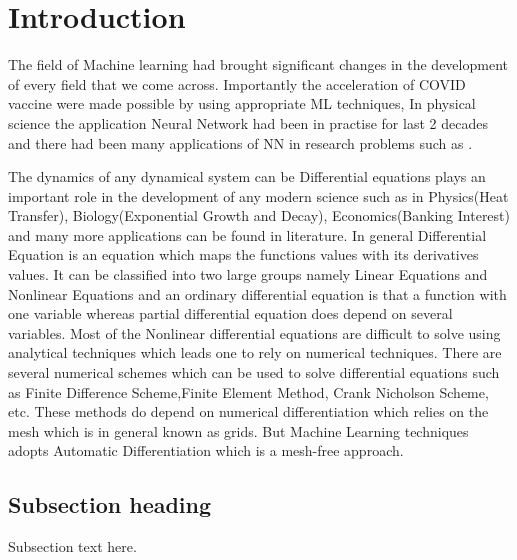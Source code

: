 \documentclass{pramana}
\begin{document}

\artcitid{\#\#\#\#}
\setcounter{page}{23}



\section{Introduction}
The field of Machine learning had brought significant changes in the development of every field that we come across. Importantly the acceleration of COVID vaccine were made possible by using appropriate ML techniques, In physical science the application Neural Network had been in practise for last 2 decades and there had been many applications of NN in research problems such as . 

The dynamics of any dynamical system can be 
Differential equations plays an important role in the development of any modern science such as in Physics(Heat Transfer), Biology(Exponential Growth and Decay), Economics(Banking Interest) and many more applications can be found in literature. In general Differential Equation is an equation which maps the functions values with its derivatives values. It can be classified into two large groups namely Linear Equations and Nonlinear Equations and an ordinary differential equation is that a function with one variable whereas partial differential equation does depend on several variables. Most of the Nonlinear differential equations are difficult to solve using analytical techniques which leads one to rely on numerical techniques. There are several numerical schemes which can be used to solve differential equations such as Finite Difference Scheme,Finite Element Method, Crank Nicholson Scheme, etc. These methods do depend on numerical differentiation which relies on the mesh which is in general known as grids. But Machine Learning techniques adopts Automatic Differentiation which is a mesh-free approach.
\subsection{Subsection heading}
Subsection text here. 
\end{document}
